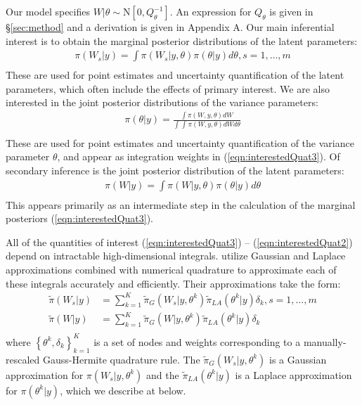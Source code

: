 \documentclass[ba]{imsart}
\begin{document}
Our model specifies $W|\theta\sim\text{N}\left[ 0,Q^{-1}_{\theta}\right]$. An expression for $Q_{\theta}$ is given in \S\ref{sec:method} and a derivation is given in Appendix A. Our main inferential interest is to obtain the marginal posterior distributions of the latent parameters:
\begin{equation}\begin{aligned}\label{eqn:interestedQuat3}
\pi(W_{s}|y) = \int \pi(W_{s}|y,\theta) \pi(\theta|y) d\theta, s = 1,\ldots,m  \\
\end{aligned}\end{equation}
These are used for point estimates and uncertainty quantification of the latent parameters, which often include the effects of primary interest. We are also interested in the joint posterior distributions of the variance parameters:
\begin{equation}\begin{aligned}\label{eqn:interestedQuat1}
\pi(\theta|y) = \frac{\int \pi(W,y,\theta) dW}{\int_{} \int_{} \pi(W,y,\theta) dW d\theta } \\
\end{aligned}\end{equation}
These are used for point estimates and uncertainty quantification of the variance parameter $\theta$, and appear as integration weights in (\ref{eqn:interestedQuat3}). Of secondary inference is the joint posterior distribution of the latent parameters:
\begin{equation}\begin{aligned}\label{eqn:interestedQuat2}
\pi(W|y) = \int \pi(W|y,\theta) \pi(\theta|y) d\theta  \\
\end{aligned}\end{equation}
This appears primarily as an intermediate step in the calculation of the marginal posteriors (\ref{eqn:interestedQuat3}).

All of the quantities of interest (\ref{eqn:interestedQuat3}) -- (\ref{eqn:interestedQuat2}) depend on intractable high-dimensional integrals. \cite{casecross} utilize Gaussian and Laplace approximations combined with numerical quadrature to approximate each of these integrals accurately and efficiently. Their approximations take the form:
\begin{equation}\begin{aligned}\label{eqn:integration}
\tilde{\pi}(W_{s}|y) &= \sum_{k=1}^{K}
\tilde{\pi}_{G}(W_{s}|y,\theta^{k})
\tilde{\pi}_{LA}(\theta^{k}|y)\delta_{k}, s = 1,\ldots,m \\
\tilde{\pi}(W|y) &= \sum_{k=1}^{K}
\tilde{\pi}_{G}(W|y,\theta^{k})
\tilde{\pi}_{LA}(\theta^{k}|y)\delta_{k} \\
\end{aligned}\end{equation}
where $\left\{\theta^{k},\delta_{k}\right\}_{k=1}^{K}$ is a set of nodes and weights corresponding to a manually-rescaled Gauss-Hermite quadrature rule. The $\tilde{\pi}_{G}(W_{s}|y,\theta^{k})$ is a Gaussian approximation for $\pi(W_{s}|y,\theta^{k})$ and the $\tilde{\pi}_{LA}(\theta^{k}|y)$ is a Laplace approximation for $\pi(\theta^{k}|y)$, which we describe at below.
\end{document}
